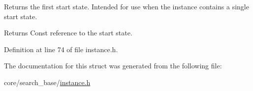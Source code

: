 Returns the first start state. Intended for use when the instance contains a single start state. 

\begin{DoxyReturn}{Returns}
Const reference to the start state. 
\end{DoxyReturn}


Definition at line 74 of file instance.\+h.



The documentation for this struct was generated from the following file\+:\begin{DoxyCompactItemize}
\item 
core/search\+\_\+base/\hyperlink{instance_8h}{instance.\+h}\end{DoxyCompactItemize}
